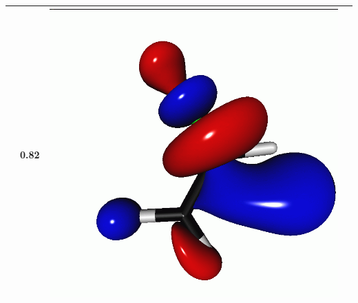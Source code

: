 \documentclass[journal=jctcce,manuscript=article]{achemso}
\begin{document}
\begin{table}[H]
\begin{tabular}{ c | c c c }
\begin{minipage}{0.2\textwidth}
     \end{minipage}
     & 0.82
     &  \begin{minipage}{0.2\textwidth}
         \centering
         \includegraphics[scale=0.10]{NTO/CH2CHF/11p.png}
     \end{minipage}
     \\
     \hline
 \end{tabular}
 \end{table}
%
\end{document}
